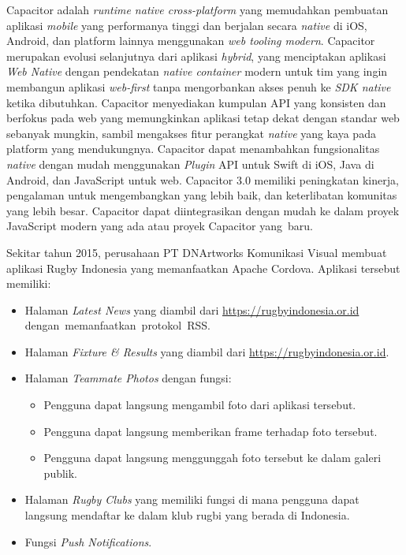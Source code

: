 \documentclass[a4paper,twoside]{article}
\begin{document}
Capacitor adalah \textit{runtime native cross-platform} yang memudahkan pembuatan aplikasi \textit{mobile} yang performanya tinggi dan berjalan secara \textit{native} di iOS, Android, dan platform lainnya menggunakan \textit{web tooling modern}. Capacitor merupakan evolusi selanjutnya dari aplikasi \textit{hybrid}, yang menciptakan aplikasi \textit{Web Native} dengan pendekatan \textit{native container} modern untuk tim yang ingin membangun aplikasi \textit{web-first} tanpa mengorbankan akses penuh ke \textit{SDK native} ketika dibutuhkan. Capacitor menyediakan kumpulan API yang konsisten dan berfokus pada web yang memungkinkan aplikasi tetap dekat dengan standar web sebanyak mungkin, sambil mengakses fitur perangkat \textit{native} yang kaya pada platform yang mendukungnya. Capacitor dapat menambahkan fungsionalitas \textit{native} dengan mudah menggunakan \textit{Plugin} API untuk Swift di iOS, Java di Android, dan JavaScript untuk web. Capacitor 3.0 memiliki peningkatan kinerja, pengalaman untuk mengembangkan yang lebih baik, dan keterlibatan komunitas yang lebih besar. Capacitor dapat diintegrasikan dengan mudah ke dalam proyek JavaScript modern yang ada atau proyek Capacitor yang~baru.

Sekitar tahun 2015, perusahaan PT DNArtworks Komunikasi Visual membuat aplikasi Rugby Indonesia yang memanfaatkan Apache Cordova. Aplikasi tersebut memiliki: 
\begin{itemize}
    \item Halaman \textit{Latest News} yang diambil dari \url{https://rugbyindonesia.or.id} dengan~memanfaatkan~protokol~RSS.
    \item Halaman \textit{Fixture \& Results} yang diambil dari \url{https://rugbyindonesia.or.id}.
    \item Halaman \textit{Teammate Photos} dengan fungsi:
    \begin{itemize}
        \item Pengguna dapat langsung mengambil foto dari aplikasi tersebut.
        \item Pengguna dapat langsung memberikan frame terhadap foto tersebut.
        \item Pengguna dapat langsung menggunggah foto tersebut ke dalam galeri publik.
    \end{itemize}
    \item Halaman \textit{Rugby Clubs} yang memiliki fungsi di mana pengguna dapat langsung mendaftar ke dalam klub rugbi yang berada di Indonesia.
    \item Fungsi \textit{Push Notifications}.
\end{itemize}
\end{document}
